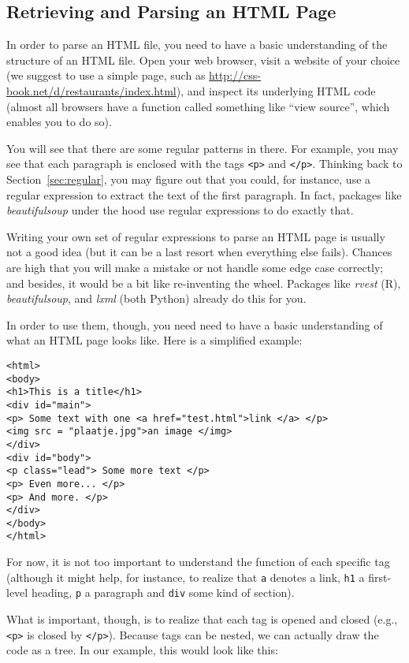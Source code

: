\subsection{Retrieving and Parsing an HTML Page}
\label{sec:parsehtml}
In order to parse an HTML file, you need to have a basic understanding
of the structure of an HTML file. Open your web browser, visit a
website of your choice (we suggest to use a simple page, such as
\url{http://css-book.net/d/restaurants/index.html}), and
 inspect its underlying HTML code (almost all browsers have a
function called something like ``view source'', which enables you to
do so).

You will see that there are some regular patterns in there. For
example, you may see that each paragraph is enclosed with the tags
\verb|<p>| and \verb|</p>|. Thinking back to Section~\ref{sec:regular}, you may figure out
that you could, for instance, use a regular expression to extract
the text of the first paragraph. In fact, packages like \emph{beautifulsoup}
under the hood use regular expressions to do exactly that.

Writing your own set of regular expressions to parse an HTML
page is usually not a good idea (but it can be a last resort when
everything else fails). Chances are high that you will make
a mistake or  not handle some edge case correctly; and besides,
it would be a bit like re-inventing the wheel. Packages like
\emph{rvest} (R), \emph{beautifulsoup}, and \emph{lxml} (both Python)
already do this for you.

In order to use them, though, you need need to have a basic
understanding of what an HTML page looks like. Here is a simplified
example:

\begin{lstlisting}
<html>
<body>
<h1>This is a title</h1>
<div id="main">
<p> Some text with one <a href="test.html">link </a> </p>
<img src = "plaatje.jpg">an image </img>
</div>
<div id="body">
<p class="lead"> Some more text </p>
<p> Even more... </p>
<p> And more. </p>
</div>
</body>
</html>
\end{lstlisting}

For now, it is not too important to understand the function of each
specific tag (although it might help, for instance, to realize that
\texttt{a} denotes a link, \texttt{h1} a first-level heading,
\texttt{p} a paragraph and \texttt{div} some kind of section).

What is important, though, is to realize that each tag is opened and
closed (e.g., \verb|<p>| is closed by \verb|</p>|).
Because tags can be nested, we can actually
draw the code as a tree. In our example, this would look like this:

